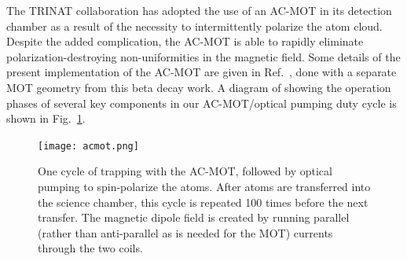 

The TRINAT collaboration has adopted the use of an AC-MOT in its detection chamber as a result of the necessity to intermittently polarize the atom cloud.  Despite the added complication, the AC-MOT is able to rapidly eliminate polarization-destroying non-uniformities in the magnetic field.  
%
Some details of the present implementation of the AC-MOT are given in Ref.~\cite{thesis}, done with a separate MOT geometry from this beta decay work.  A diagram of showing the operation phases of several key components in our AC-MOT/optical pumping duty cycle is shown in Fig.~\ref{fig:acmot}.

\begin{figure}[ht]
	\centering
		\texttt{[image: acmot.png]}
		\caption[The AC-MOT and Optical Pumping Cycle]{One cycle of trapping with the AC-MOT, followed by optical pumping to spin-polarize the atoms.  After atoms are transferred into the science chamber, this cycle is repeated 100 times before the next transfer.  The magnetic dipole field is created by running parallel (rather than anti-parallel as is needed for the MOT) currents through the two coils.}
		\label{fig:acmot}
\end{figure}


\note[note]{}

%

